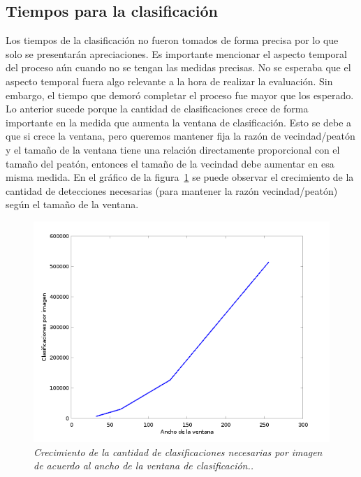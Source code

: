 \subsection{Tiempos para la clasificación}

Los tiempos de la clasificación no fueron tomados de forma precisa por lo que solo se presentarán apreciaciones. Es importante mencionar el aspecto temporal del proceso aún cuando no se tengan las medidas precisas. No se esperaba que el aspecto temporal fuera algo relevante a la hora de realizar la evaluación. Sin embargo, el tiempo que demoró completar el proceso fue mayor que los esperado. Lo anterior sucede porque la cantidad de clasificaciones crece de forma importante en la medida que aumenta la ventana de clasificación. Esto se debe a que si crece la ventana, pero queremos mantener fija la razón de vecindad/peatón y el tamaño de la ventana tiene una relación directamente proporcional con el tamaño del peatón, entonces el tamaño de la vecindad debe aumentar en esa misma medida. En el gráfico de la figura~\ref{fig:grow} se puede observar el crecimiento de la cantidad de detecciones necesarias (para mantener la razón vecindad/peatón) según el tamaño de la ventana. 

\begin{figure}[H]
  \centering
  \includegraphics[scale=.6]{images/clasgrow}
  \caption{\em Crecimiento de la cantidad de clasificaciones necesarias por imagen de acuerdo al ancho de la ventana de clasificación..}  
  \label{fig:grow}
\end{figure}

